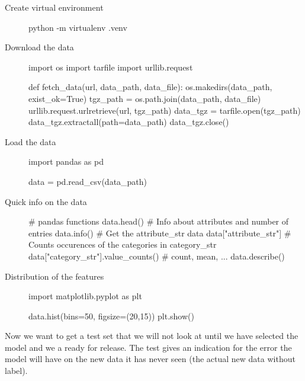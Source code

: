 \begin{description}
  \item [Create virtual environment] \hfill
    \begin{python}
      python -m virtualenv .venv
    \end{python}
  \item [Download the data] \hfill
    \begin{python}
      import os
      import tarfile
      import urllib.request

      def fetch_data(url, data_path, data_file):
        os.makedirs(data_path, exist_ok=True)
        tgz_path = os.path.join(data_path, data_file)
        urllib.request.urlretrieve(url, tgz_path)
        data_tgz = tarfile.open(tgz_path)
        data_tgz.extractall(path=data_path)
        data_tgz.close()
    \end{python}

  \item [Load the data] \hfill
    \begin{python}
      import pandas as pd

      data = pd.read_csv(data_path)
    \end{python}

  \item [Quick info on the data] \hfill
    \begin{python}
      # pandas functions
      data.head()
      # Info about attributes and number of entries
      data.info()
      # Get the attribute_str data
      data["attribute_str"]
      # Counts occurences of the categories in category_str
      data["category_str"].value_counts()
      # count, mean, ...
      data.describe()
    \end{python}

    \item [Distribution of the features] \hfill
    \begin{python}
      import matplotlib.pyplot as plt

      data.hist(bins=50, figsize=(20,15))
      plt.show()
    \end{python}
\end{description}

Now we want to get a test set that we will not look at until we have selected the model and we a ready for release. The test gives an indication for the error the model will have on the new data it has never seen (the actual new data without label).\\

